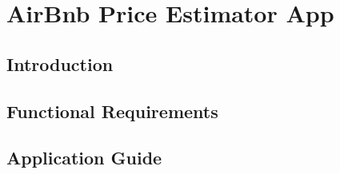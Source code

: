 \section{AirBnb Price Estimator App}

\subsection{Introduction}

\subsection{Functional Requirements}

\subsection{Application Guide}